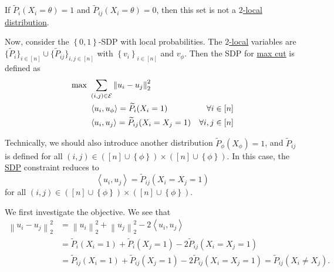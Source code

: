 \begin{eg}
	If \(\widetilde{P} _i (X_i = \theta ) = 1\) and \(\widetilde{P} _{ij}(X_i = \theta ) = 0\), then this set is not a \hyperref[def:2-local-distribution]{\(2\)-local distribution}.
\end{eg}

Now, consider the \(\left\{ 0, 1 \right\} \)-SDP with local probabilities. The \hyperref[def:2-local-distribution]{\(2\)-local} variables are \(\{ \widetilde{P} _i \} _{i\in [n]} \cup  \{ \widetilde{P} _{ij} \}_{i, j\in [n]} \) with \(\left\{ v_i \right\} _{i\in [n]}\) and \(v_\phi \). Then the SDP for \hyperref[prb:max-cut]{max cut} is defined as
\[
	\begin{aligned}
		\max~ & \sum_{(i, j)\in \mathcal{\MakeUppercase{e}} }\left\lVert u_i - u_j\right\rVert _2^2                       \\
		      & \left\langle u_i, u_\phi  \right\rangle = \widetilde{P} _i(X_i = 1)                 & \forall i\in [n]    \\
		      & \left\langle u_i, u_j  \right\rangle = \widetilde{P} _{ij}(X_i = X_j = 1)           & \forall i, j\in [n] \\
	\end{aligned}
\]

\begin{remark}
	Technically, we should also introduce another distribution \(\widetilde{P} _{\phi }(X_\phi) = 1\), and \(\widetilde{P} _{ij}\) is defined for all \((i, j)\in ([n]\cup \left\{ \phi  \right\} )\times ([n]\cup \left\{ \phi  \right\} )\). In this case, the \hyperref[def:SDP]{SDP} constraint reduces to
	\[
		\left\langle  u_i, u_j \right\rangle = \widetilde{P} _{ij}(X_{i} = X_{j} =1)
	\]
	for all \((i, j)\in ([n]\cup \left\{ \phi  \right\} )\times ([n]\cup \left\{ \phi \right\} )\).
\end{remark}

We first investigate the objective. We see that
\[
	\begin{split}
		\left\lVert u_i - u_j\right\rVert _2^2
		&= \left\lVert u_i\right\rVert _2^2 + \left\lVert u_j\right\rVert _2^2 - 2\left\langle u_{i} , u_{j}  \right\rangle \\
		&= \widetilde{P} _i(X_i = 1)+ \widetilde{P} _i(X_j = 1) - 2 \widetilde{P} _{ij} ( X_i = X_j = 1)\\
		&= \widetilde{P} _{ij}(X_i = 1)+ \widetilde{P} _{ij}(X_j = 1) - 2 \widetilde{P} _{ij} ( X_i = X_j = 1)
		= \widetilde{P} _{ij} ( X_i \neq X_j).
	\end{split}
\]

